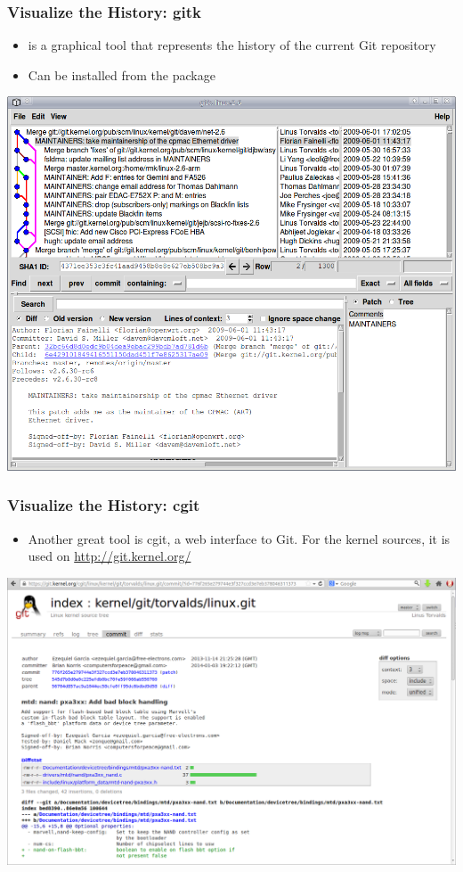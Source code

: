\begin{frame}
  \frametitle{Visualize the History: gitk}
  \begin{itemize}
  \item {} is a graphical tool that represents the history of
    the current Git repository
  \item Can be installed from the  package
  \end{itemize}
  \begin{center}
    \includegraphics[height=0.65\textheight]{slides/kernel-git-content/gitk.png}
  \end{center}
\end{frame}

\begin{frame}
  \frametitle{Visualize the History: cgit}
  \begin{itemize}
  \item Another great tool is cgit, a web interface to Git. For the
    kernel sources, it is used on \url{http://git.kernel.org/}
  \end{itemize}
  \begin{center}
    \includegraphics[height=0.65\textheight]{slides/kernel-git-content/git-kernel-org.png}
  \end{center}
\end{frame}

